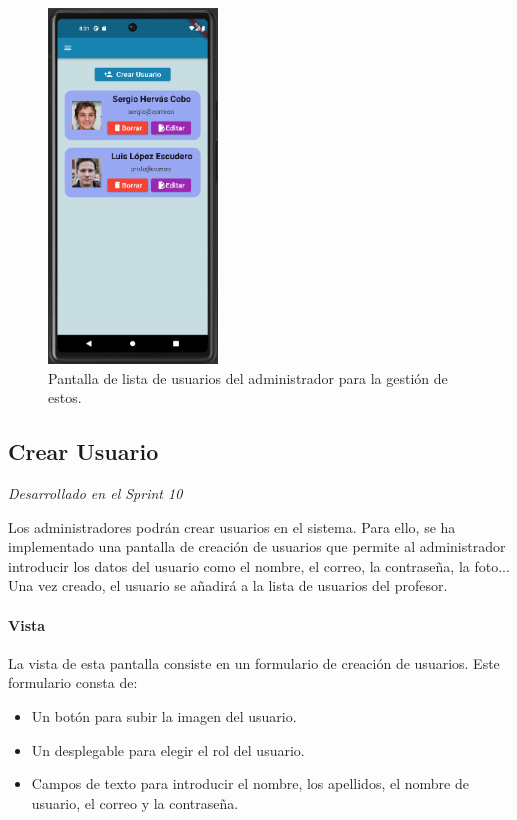 \begin{figure}[H]
  \centering
  \includegraphics[width=0.4\textwidth]{imagenes/c7/listausuarios.png}
  \caption{Pantalla de lista de usuarios del administrador para la gestión de estos.} 
  \label{fig:listausuarios}
\end{figure}


\subsection{Crear Usuario} 

\textit{Desarrollado en el Sprint 10}

Los administradores podrán crear usuarios en el sistema. Para ello, se ha implementado una pantalla de creación de usuarios que permite al administrador introducir los datos del usuario como el nombre, el correo, la contraseña, la foto... Una vez creado, el usuario se añadirá a la lista de usuarios del profesor.


\paragraph*{Vista}
La vista de esta pantalla consiste en un formulario de creación de usuarios. Este formulario consta de:
\begin{itemize}
  \item Un botón para subir la imagen del usuario.
  \item Un desplegable para elegir el rol del usuario.
  \item Campos de texto para introducir el nombre, los apellidos, el nombre de usuario, el correo y la contraseña.
\end{itemize}


